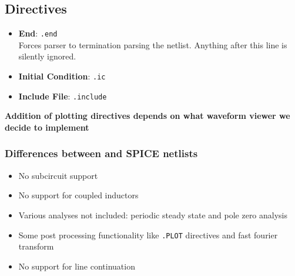 \subsection*{Directives}

\begin{itemize}
    \item \textbf{End}: \texttt{.end}\\
    Forces parser to termination parsing the netlist. Anything after this line is silently ignored.
    \item \textbf{Initial Condition}: \texttt{.ic}
    \item \textbf{Include File}: \texttt{.include}
\end{itemize}

\textbf{Addition of plotting directives depends on what waveform viewer we decide to implement}
\subsubsection*{Differences between \turmeric and SPICE netlists}
\begin{itemize}
    \item No subcircuit support
    \item No support for coupled inductors
    \item Various analyses not included: periodic steady state and pole zero analysis
    \item Some post processing functionality like \texttt{.PLOT} directives and fast fourier transform
    \item No support for line continuation
\end{itemize}

